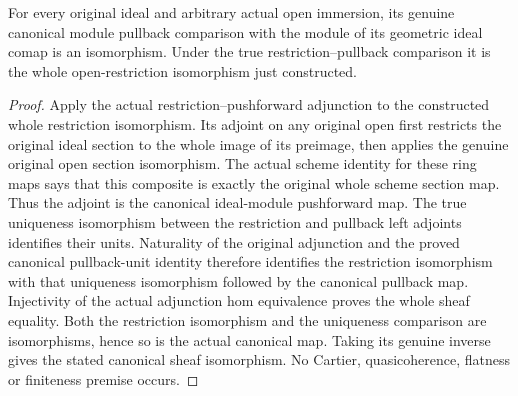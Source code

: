 \begin{lemma}
\label{lem:actual-ideal-open-canonical-pullback-iso}
\leanok
{}
For every original ideal and arbitrary actual open immersion, its genuine
canonical module pullback comparison with the module of its geometric
ideal comap is an isomorphism. Under the true restriction--pullback
comparison it is the whole open-restriction isomorphism just constructed.
\end{lemma}
\begin{proof}
Apply the actual restriction--pushforward adjunction to the constructed
whole restriction isomorphism. Its adjoint on any original open first
restricts the original ideal section to the whole image of its preimage,
then applies the genuine original open section isomorphism. The actual
scheme identity for these ring maps says that this composite is exactly
the original whole scheme section map. Thus the adjoint is the canonical
ideal-module pushforward map. The true uniqueness isomorphism between
the restriction and pullback left adjoints identifies their units.
Naturality of the original adjunction and the proved canonical
pullback-unit identity therefore identifies the restriction isomorphism
with that uniqueness isomorphism followed by the canonical pullback map.
Injectivity of the actual adjunction hom equivalence proves the whole
sheaf equality. Both the restriction isomorphism and the uniqueness
comparison are isomorphisms, hence so is the actual canonical map.
Taking its genuine inverse gives the stated canonical sheaf isomorphism.
No Cartier, quasicoherence, flatness or finiteness premise occurs.
\end{proof}

